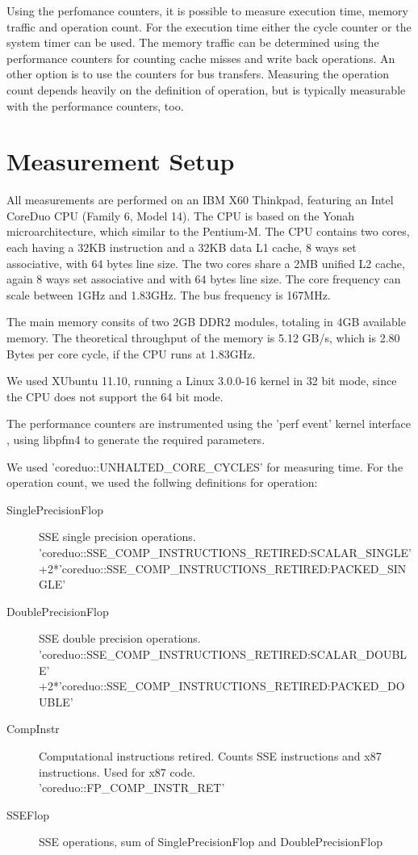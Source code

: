 \documentclass[a4paper,12pt]{article}
\begin{document}
Using the perfomance counters, it is possible to measure execution time, memory
traffic and operation count. For the execution time either the cycle counter or
the system timer can be used. The memory traffic can be determined using the
performance counters for counting cache misses and write back operations. An
other option is to use the counters for bus transfers. Measuring the operation count
depends heavily on the definition of operation, but is typically measurable with
the performance counters, too.

\section{Measurement Setup}
All measurements are performed on an IBM X60 Thinkpad, featuring an Intel
CoreDuo CPU (Family 6, Model 14). The CPU is based on the Yonah
microarchitecture, which similar to the Pentium-M. The CPU contains two cores,
each having a 32KB instruction and a 32KB data L1 cache, 8 ways set associative,
with 64 bytes line size. The two cores share a 2MB unified L2 cache, again 8
ways set associative and with 64 bytes line size. The core frequency can scale
between 1GHz and 1.83GHz. The bus frequency is 167MHz. 

The main memory consits of two 2GB DDR2 modules, totaling in 4GB available
memory. The theoretical throughput of the memory is 5.12 GB/s, which is 2.80
Bytes per core cycle, if the CPU runs at 1.83GHz.

We used XUbuntu 11.10, running a Linux 3.0.0-16 kernel in 32 bit mode, since
the CPU does not support the 64 bit mode.

The performance counters are instrumented using the 'perf event' kernel
interface \cite{unoffPerfEventsWebPage}, using libpfm4  \cite{libpfm4Docu} to
generate the required parameters.

We used 'coreduo::UNHALTED\_CORE\_CYCLES' for measuring time. For the operation
count, we used the follwing definitions for operation: 
\begin{description}
\item[SinglePrecisionFlop] SSE single precision operations.
\\{\footnotesize
'coreduo::SSE\_COMP\_INSTRUCTIONS\_RETIRED:SCALAR\_SINGLE'\\
+2*'coreduo::SSE\_COMP\_INSTRUCTIONS\_RETIRED:PACKED\_SINGLE'}
\item[DoublePrecisionFlop] SSE double precision operations.
\\{\footnotesize
'coreduo::SSE\_COMP\_INSTRUCTIONS\_RETIRED:SCALAR\_DOUBLE'\\
+2*'coreduo::SSE\_COMP\_INSTRUCTIONS\_RETIRED:PACKED\_DOUBLE'}
\item[CompInstr] Computational instructions retired. Counts SSE instructions
and x87 instructions. Used for x87 code. 
\\{\footnotesize 'coreduo::FP\_COMP\_INSTR\_RET'}
\item[SSEFlop] SSE operations, sum of SinglePrecisionFlop and
DoublePrecisionFlop
\end{description}
\end{document}
